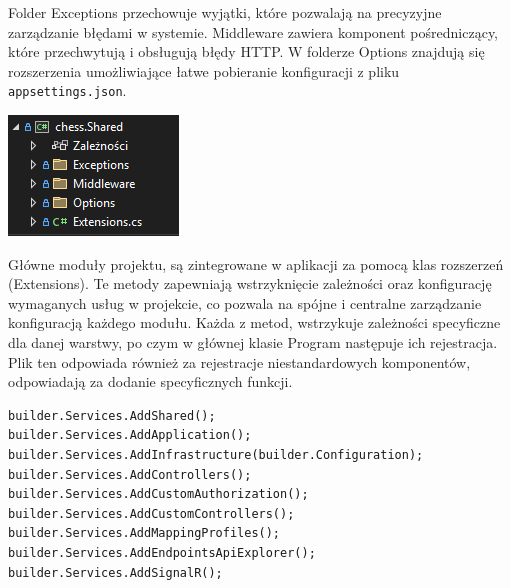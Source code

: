 \documentclass[twoside]{projektInzynierskiMS1}
\begin{document}
\vspace{0.5cm}
\noindent
\begin{minipage}[t]{0.5\textwidth}
    \vspace{0pt}
    \justifying 
    \noindent
    Folder Exceptions przechowuje wyjątki, które pozwalają na precyzyjne zarządzanie błędami w systemie. Middleware zawiera komponent pośredniczący, które przechwytują i obsługują błędy HTTP. W folderze Options znajdują się rozszerzenia umożliwiające łatwe pobieranie konfiguracji z pliku \texttt{appsettings.json}.
\end{minipage}
\hfill
\begin{minipage}[t]{0.4\textwidth}
    \vspace{0pt}
    \centering
    \includegraphics[width=\linewidth]{images/struktura_back_shared.png} 
\end{minipage}
\vspace{0.5cm}

\noindent
Główne moduły projektu, są zintegrowane w aplikacji za pomocą klas rozszerzeń (Extensions). Te metody zapewniają wstrzyknięcie zależności oraz konfigurację wymaganych usług w projekcie, co pozwala na spójne i centralne zarządzanie konfiguracją każdego modułu. Każda z metod, wstrzykuje zależności specyficzne dla danej warstwy, po czym w głównej klasie Program następuje ich rejestracja. Plik ten odpowiada również za rejestracje niestandardowych komponentów, odpowiadają za dodanie specyficznych funkcji.

\vspace{0.5cm}
\begin{lstlisting}[language=CSharp]
builder.Services.AddShared();
builder.Services.AddApplication();
builder.Services.AddInfrastructure(builder.Configuration);
builder.Services.AddControllers();
builder.Services.AddCustomAuthorization();
builder.Services.AddCustomControllers();
builder.Services.AddMappingProfiles();
builder.Services.AddEndpointsApiExplorer();
builder.Services.AddSignalR();
\end{lstlisting}
\end{document}
